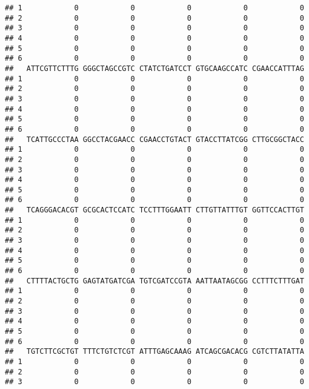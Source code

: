\documentclass[]{article}
\begin{document}
\begin{verbatim}
## 1            0            0            0            0            0
## 2            0            0            0            0            0
## 3            0            0            0            0            0
## 4            0            0            0            0            0
## 5            0            0            0            0            0
## 6            0            0            0            0            0
##   ATTCGTTCTTTG GGGCTAGCCGTC CTATCTGATCCT GTGCAAGCCATC CGAACCATTTAG
## 1            0            0            0            0            0
## 2            0            0            0            0            0
## 3            0            0            0            0            0
## 4            0            0            0            0            0
## 5            0            0            0            0            0
## 6            0            0            0            0            0
##   TCATTGCCCTAA GGCCTACGAACC CGAACCTGTACT GTACCTTATCGG CTTGCGGCTACC
## 1            0            0            0            0            0
## 2            0            0            0            0            0
## 3            0            0            0            0            0
## 4            0            0            0            0            0
## 5            0            0            0            0            0
## 6            0            0            0            0            0
##   TCAGGGACACGT GCGCACTCCATC TCCTTTGGAATT CTTGTTATTTGT GGTTCCACTTGT
## 1            0            0            0            0            0
## 2            0            0            0            0            0
## 3            0            0            0            0            0
## 4            0            0            0            0            0
## 5            0            0            0            0            0
## 6            0            0            0            0            0
##   CTTTTACTGCTG GAGTATGATCGA TGTCGATCCGTA AATTAATAGCGG CCTTTCTTTGAT
## 1            0            0            0            0            0
## 2            0            0            0            0            0
## 3            0            0            0            0            0
## 4            0            0            0            0            0
## 5            0            0            0            0            0
## 6            0            0            0            0            0
##   TGTCTTCGCTGT TTTCTGTCTCGT ATTTGAGCAAAG ATCAGCGACACG CGTCTTATATTA
## 1            0            0            0            0            0
## 2            0            0            0            0            0
## 3            0            0            0            0            0

\end{verbatim}
\end{document}
